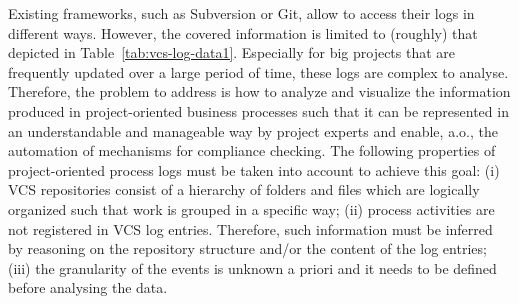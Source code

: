 

Existing frameworks, such as Subversion or Git, allow to access their logs in different ways. However, the covered information is limited to (roughly) that depicted in Table~\ref{tab:vcs-log-data1}. Especially for big projects that are frequently updated over a large period of time, these logs are complex to analyse.
Therefore, the problem to address is how to analyze and visualize the information produced in project-oriented business processes such that it can be represented in an understandable and manageable way by project experts and
enable, a.o., the automation of mechanisms for compliance checking.
The following properties of project-oriented process logs must be taken into account to achieve this goal: (i) VCS repositories consist of a hierarchy of folders and files which are logically organized such that work is grouped in a specific way; (ii) process activities are not registered in VCS log entries. Therefore, such information must be inferred by reasoning on the repository structure and/or the content of the log entries; (iii) the granularity of the events is unknown a priori and it needs to be defined before analysing the data.



%
%

